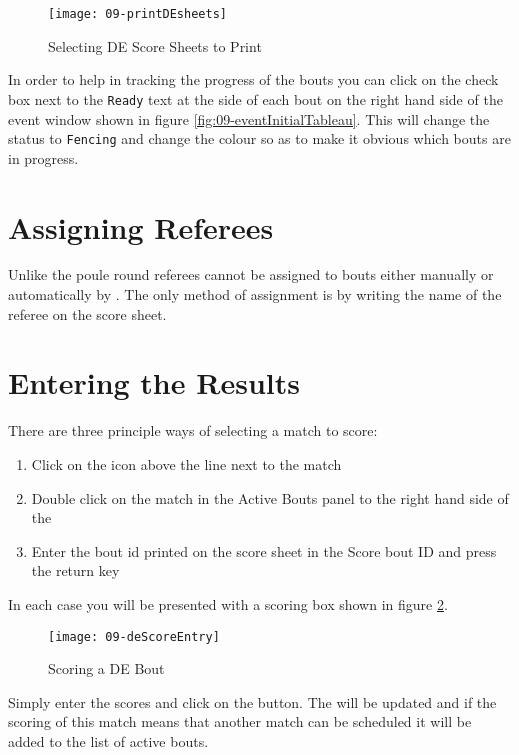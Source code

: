 \documentclass[a4paper,11pt]{memoir}
\begin{document}
\begin{figure}[!ht]
 \centering
 \texttt{[image: 09-printDEsheets]}
 \caption{Selecting DE Score Sheets to Print} \label{fig:09-printDEsheets}
\end{figure}

In order to help in tracking the progress of the bouts you can click on the check box next to the \texttt{Ready} text at the side of each bout on the right hand side of the event window shown in figure \ref{fig:09-eventInitialTableau}. This will change the status to \texttt{Fencing} and change the colour so as to make it obvious which bouts are in progress.

\section{Assigning Referees}

Unlike the poule round referees cannot be assigned to bouts either manually or automatically by \fencingtime{}. The only method of assignment is by writing the name of the referee on the score sheet. 

\section{Entering the Results}

There are three principle ways of selecting a match to score:
\begin{enumerate}
 \item Click on the icon above the line next to the match 
 \item Double click on the match in the Active Bouts panel to the right hand side of the  
 \item Enter the bout id printed on the score sheet in the Score bout ID and press the return key
\end{enumerate}

In each case you will be presented with a scoring box shown in figure \ref{fig:09-deScoreEntry}.

\begin{figure}[!ht]
 \centering
 \texttt{[image: 09-deScoreEntry]}
 \caption{Scoring a DE Bout} \label{fig:09-deScoreEntry}
\end{figure}

Simply enter the scores and click on the  button. The  will be updated and if the scoring of this match means that another match can be scheduled it will be added to the list of active bouts. 
\end{document}
